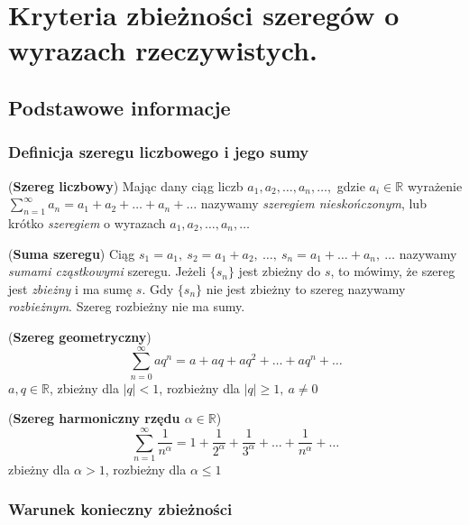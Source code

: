 \chapter{Kryteria zbieżności szeregów o wyrazach rzeczywistych.}

\section{Podstawowe informacje}

\subsection{Definicja szeregu liczbowego i jego sumy}

\begin{df}{(\textbf{Szereg liczbowy})}
Mając dany ciąg liczb $a_{1}, a_{2},\ldots , a_{n},\ldots,$ gdzie $a_{i}\in\mathbb{R}$ wyrażenie $\sum_{n=1}^{\infty}a_{n}=a_{1}+a_{2}+\ldots +a_{n}+\ldots$ nazywamy \textit{szeregiem nieskończonym}, lub krótko \textit{szeregiem} o wyrazach $a_{1}, a_{2},\ldots , a_{n},\ldots$
\end{df}

\begin{df}{(\textbf{Suma szeregu})}
Ciąg $s_{1}=a_{1},\ s_{2}=a_{1}+a_{2},\ \ldots,\ s_{n}=a_{1}+\ldots +a_{n},\ \ldots$ nazywamy \textit{sumami cząstkowymi} szeregu. Jeżeli $\lbrace s_{n}\rbrace$ jest zbieżny do $s$, to mówimy, że szereg jest \textit{zbieżny} i ma sumę $s$. Gdy $\lbrace s_{n}\rbrace$ nie jest zbieżny to szereg nazywamy \textit{rozbieżnym}. Szereg rozbieżny nie ma sumy.
\end{df}

\begin{przyk}{(\textbf{Szereg geometryczny})}
$$\sum_{n=0}^{\infty}aq^n=a+aq+aq^2+\ldots+aq^n+\ldots$$ $a, q\in\mathbb{R}$, zbieżny dla $\mid q\mid<1$, rozbieżny dla $\mid q\mid\geq1,\ a\neq 0$
\end{przyk}

\begin{przyk}{(\textbf{Szereg harmoniczny rzędu $\alpha\in\mathbb{R}$})}
$$\sum_{n=1}^{\infty}\frac{1}{n^{\alpha}}=1+\frac{1}{2^{\alpha}}+\frac{1}{3^{\alpha}}+\ldots+\frac{1}{n^{\alpha}}+\ldots$$
zbieżny dla $\alpha>1$, rozbieżny dla $\alpha\leq 1$
\end{przyk}

\subsection{Warunek konieczny zbieżności}

